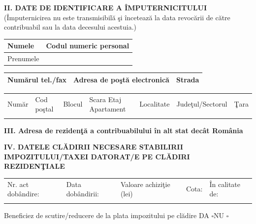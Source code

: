 \documentclass[10pt,a4paper,landscape]{article}
\newcommand{\fillline}[1][6cm]{\underline{\hspace{#1}}}
\newcommand{\checkboxempty}{$\square$}
\begin{document}
\vspace{0.3cm}

\textbf{II. DATE DE IDENTIFICARE A ÎMPUTERNICITULUI} \footnotesize (Împuternicirea nu este transmisibilă şi încetează la data revocării de către contribuabil sau la data decesului acestuia.) \normalsize

\begin{tabularx}{\textwidth}{|X|X|}
\hline
Numele \fillline[6cm] & Codul numeric personal \fillline[4cm] \\
\hline
Prenumele \fillline[6cm] & \\
\hline
\end{tabularx}

\begin{tabularx}{\textwidth}{|X|X|X|}
\hline
Numărul tel./fax \fillline[3cm] & Adresa de poştă electronică \fillline[4cm] & Strada \fillline[5cm] \\
\hline
\end{tabularx}

\begin{tabularx}{\textwidth}{|X|X|X|X|X|X|X|}
\hline
Număr & Cod poştal & Blocul & Scara \quad Etaj \quad Apartament & Localitate & Judeţul/Sectorul & Ţara \\
\fillline[1.5cm] & \fillline[2cm] & \fillline[1.5cm] & \fillline[3cm] & \fillline[3cm] & \fillline[3cm] & \fillline[2cm] \\
\hline
\end{tabularx}

\vspace{0.3cm}

\textbf{III. Adresa de reziden\c{t}ă a contribuabilului în alt stat decât România}\\
\fillline[18cm]

\vspace{0.3cm}

\textbf{IV. DATELE CLĂDIRII NECESARE STABILIRII IMPOZITULUI/TAXEI DATORAT/E PE CLĂDIRI REZIDENŢIALE}

\begin{tabularx}{\textwidth}{|X|X|X|X|X|}
\hline
Nr. act dobândire: & Data dobândirii: & Valoare achiziţie (lei) & Cota: & În calitate de: \\
\fillline[3cm] & \fillline[3cm] & \fillline[3cm] & \fillline[2cm] & \fillline[3cm] \\
\hline
\end{tabularx}

Beneficiez de scutire/reducere de la plata impozitului pe clădire \quad DA \checkboxempty \quad NU \checkboxempty
\end{document}
